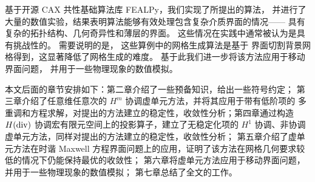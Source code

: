 基于开源 CAX 共性基础算法库 FEALPy，我们实现了所提出的算法，
并进行了大量的数值实验，结果表明算法能够有效处理包含复杂介质界面的情况——
具有复杂的拓扑结构、几何奇异性和薄层的界面。
这些情况在实践中通常被认为是具有挑战性的。
需要说明的是，
这些算例中的网格生成算法是基于
界面切割背景网格得到，这显著降低了网格生成的难度。
基于此我们进一步将该方法应用于移动界面问题，
并用于一些物理现象的数值模拟。



本文后面的章节安排如下：第二章介绍了一些预备知识，给出一些符号约定；
第三章介绍了任意维任意次的 $H^m$ 协调虚单元方法，并将其应用于带有低阶项的 
多重调和方程求解，对提出的方法建立的稳定性，收敛性分析；第四章通过构造 $H(\operatorname{div})$
协调宏有限元空间上的投影算子，建立了无稳定化项的 $H^1$
协调、非协调虚单元方法，同样对提出的方法建立的稳定性，收敛性分析；
第五章介绍了虚单元方法在时谐 Maxwell
方程界面问题上的应用，证明了该方法在网格几何要求较低的情况下仍能保持最优的收敛性；
第六章将虚单元方法应用于移动界面问题，并用于一些物理现象的数值模拟；
第七章总结了全文的工作。









